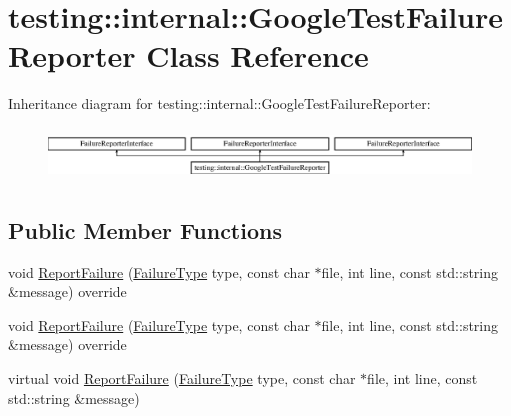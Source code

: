 \hypertarget{classtesting_1_1internal_1_1_google_test_failure_reporter}{}\section{testing\+::internal\+::Google\+Test\+Failure\+Reporter Class Reference}
\label{classtesting_1_1internal_1_1_google_test_failure_reporter}
Inheritance diagram for testing\+::internal\+::Google\+Test\+Failure\+Reporter\+:\begin{figure}[H]
\begin{center}
\leavevmode
\includegraphics[height=1.424936cm]{de/db0/classtesting_1_1internal_1_1_google_test_failure_reporter}
\end{center}
\end{figure}
\subsection*{Public Member Functions}
\begin{DoxyCompactItemize}
\item 
void \mbox{\hyperlink{classtesting_1_1internal_1_1_google_test_failure_reporter_aff7bfa8521e770d718172c99c807ec39}{Report\+Failure}} (\mbox{\hyperlink{googletest-master_2googletest_2test_2gtest__environment__test_8cc_aa43ad7e2c1c5c5150ba8d95607a96263}{Failure\+Type}} type, const char $\ast$file, int line, const std\+::string \&message) override
\item 
void \mbox{\hyperlink{classtesting_1_1internal_1_1_google_test_failure_reporter_aff7bfa8521e770d718172c99c807ec39}{Report\+Failure}} (\mbox{\hyperlink{googletest-master_2googletest_2test_2gtest__environment__test_8cc_aa43ad7e2c1c5c5150ba8d95607a96263}{Failure\+Type}} type, const char $\ast$file, int line, const std\+::string \&message) override
\item 
virtual void \mbox{\hyperlink{classtesting_1_1internal_1_1_google_test_failure_reporter_a096dae47177340acac5f3d6528b852ca}{Report\+Failure}} (\mbox{\hyperlink{googletest-master_2googletest_2test_2gtest__environment__test_8cc_aa43ad7e2c1c5c5150ba8d95607a96263}{Failure\+Type}} type, const char $\ast$file, int line, const std\+::string \&message)
\end{DoxyCompactItemize}


